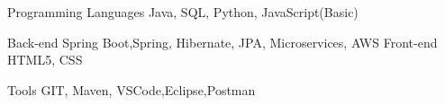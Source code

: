 

\begin{cvskills}
  \cvskill
    {Programming Languages} %
    {Java, SQL, Python, JavaScript(Basic)} %

  \cvskill
    {Back-end} %
    {Spring Boot,Spring, Hibernate, JPA, Microservices, AWS} %
  \cvskill
    {Front-end} %
    { HTML5, CSS} %

  \cvskill
    {Tools} %
    {GIT, Maven, VSCode,Eclipse,Postman} %

\end{cvskills}
